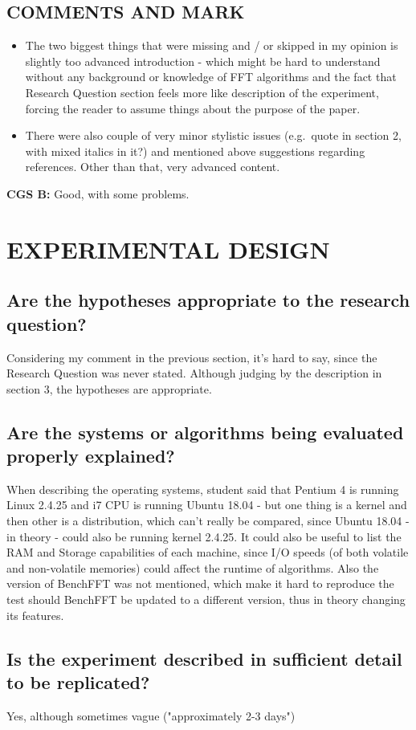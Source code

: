 \documentclass{article}
\begin{document}
\begin{normalsize}
 \subsection{COMMENTS AND MARK} 
 \begin{itemize}
   \item The two biggest things that were missing and / or skipped in my opinion is slightly too advanced introduction - which might be hard to understand without any background or knowledge of FFT algorithms and the fact that Research Question section feels more like description of the experiment, forcing the reader to assume things about the purpose of the paper.
   \item There were also couple of very minor stylistic issues (e.g.\ quote in section 2, with mixed italics in it?) and mentioned above suggestions regarding references.
Other than that, very advanced content.
\end{itemize}
\textbf{CGS B:}
Good, with some problems.

\section{EXPERIMENTAL DESIGN}
\subsection{Are the hypotheses appropriate to the research question?}
Considering my comment in the previous section, it's hard to say, since the Research Question was never stated. Although judging by the description in section 3, the hypotheses are appropriate. 
\subsection{Are the systems or algorithms being evaluated properly explained?}
When describing the operating systems, student said that Pentium 4 is running Linux 2.4.25 and i7 CPU is running Ubuntu 18.04 - but one thing is a kernel and then other is a distribution, which can't really be compared, since Ubuntu 18.04 - in theory - could also be running kernel 2.4.25.
\bigbreak\noindent
It could also be useful to list the RAM and Storage capabilities of each machine, since I/O speeds (of both volatile and non-volatile memories) could affect the runtime of algorithms.
\bigbreak\noindent
Also the version of BenchFFT was not mentioned, which make it hard to reproduce the test should BenchFFT be updated to a different version, thus in theory changing its features.
\subsection{Is the experiment described in sufficient detail to be replicated?}
Yes, although sometimes vague ("approximately 2-3 days")

\end{normalsize}
\end{document}
